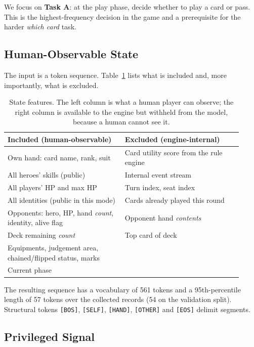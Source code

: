 \documentclass[11pt]{article}
\begin{document}
We focus on \textbf{Task A}: at the play phase, decide whether to play a card or pass. This
is the highest-frequency decision in the game and a prerequisite for the harder
\emph{which card} task.

\subsection{Human-Observable State}

The input is a token sequence. Table~\ref{tab:state} lists what is included and, more
importantly, what is excluded.

\begin{table}[t]
\centering
\small
\begin{tabular}{@{}p{0.46\linewidth}p{0.46\linewidth}@{}}
\toprule
\textbf{Included (human-observable)} & \textbf{Excluded (engine-internal)} \\
\midrule
Own hand: card name, rank, suit & Card utility score from the rule engine \\
All heroes' skills (public) & Internal event stream \\
All players' HP and max HP & Turn index, seat index \\
All identities (public in this mode) & Cards already played this round \\
Opponents: hero, HP, hand \emph{count}, identity, alive flag & Opponent hand \emph{contents} \\
Deck remaining \emph{count} & Top card of deck \\
Equipments, judgement area, chained/flipped status, marks & \\
Current phase & \\
\bottomrule
\end{tabular}
\caption{State features. The left column is what a human player can observe; the right
column is available to the engine but withheld from the model, because a human cannot see
it.}
\label{tab:state}
\end{table}

The resulting sequence has a vocabulary of 561 tokens and a 95th-percentile length of 57
tokens over the collected records (54 on the validation split). Structural tokens
\texttt{[BOS]}, \texttt{[SELF]}, \texttt{[HAND]}, \texttt{[OTHER]} and \texttt{[EOS]}
delimit segments.

\subsection{Privileged Signal}
\end{document}
